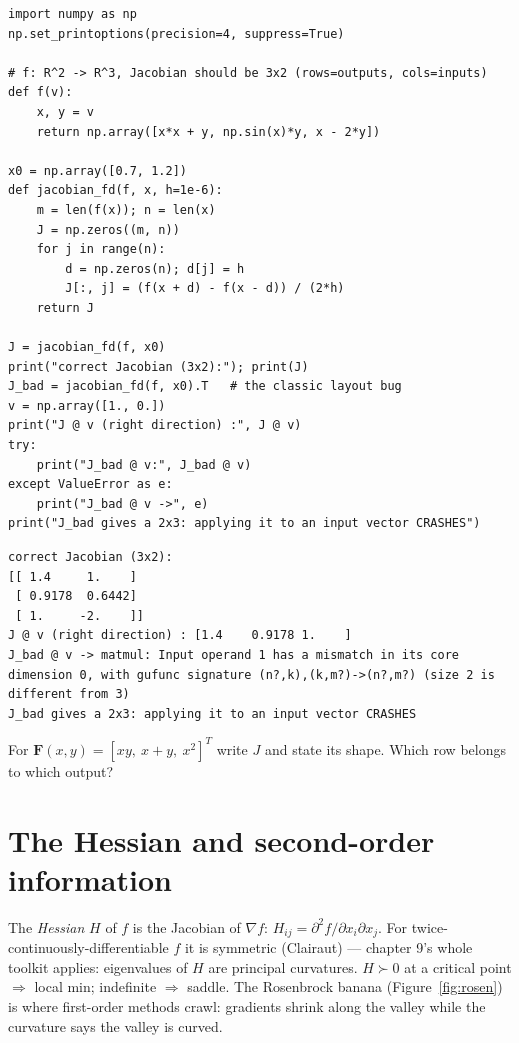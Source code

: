\begin{lstlisting}[caption={\ttfamily code/ch11\_wrong\_layout.py --- the
instructive layout bug: transposing the Jacobian produces a $2\times3$
that cannot even act on an input vector.}]
import numpy as np
np.set_printoptions(precision=4, suppress=True)

# f: R^2 -> R^3, Jacobian should be 3x2 (rows=outputs, cols=inputs)
def f(v):
    x, y = v
    return np.array([x*x + y, np.sin(x)*y, x - 2*y])

x0 = np.array([0.7, 1.2])
def jacobian_fd(f, x, h=1e-6):
    m = len(f(x)); n = len(x)
    J = np.zeros((m, n))
    for j in range(n):
        d = np.zeros(n); d[j] = h
        J[:, j] = (f(x + d) - f(x - d)) / (2*h)
    return J

J = jacobian_fd(f, x0)
print("correct Jacobian (3x2):"); print(J)
J_bad = jacobian_fd(f, x0).T   # the classic layout bug
v = np.array([1., 0.])
print("J @ v (right direction) :", J @ v)
try:
    print("J_bad @ v:", J_bad @ v)
except ValueError as e:
    print("J_bad @ v ->", e)
print("J_bad gives a 2x3: applying it to an input vector CRASHES")
\end{lstlisting}

\begin{lstlisting}[caption={Output of the layout bug. Notice the
transposed Jacobian is a $2\times3$ --- the error only fires when you try
to apply it. Layout bugs in gradients are silent precisely where the
shapes happen to agree.}]
correct Jacobian (3x2):
[[ 1.4     1.    ]
 [ 0.9178  0.6442]
 [ 1.     -2.    ]]
J @ v (right direction) : [1.4    0.9178 1.    ]
J_bad @ v -> matmul: Input operand 1 has a mismatch in its core dimension 0, with gufunc signature (n?,k),(k,m?)->(n?,m?) (size 2 is different from 3)
J_bad gives a 2x3: applying it to an input vector CRASHES
\end{lstlisting}

\begin{exercise}[easy]
For $\mathbf F(x,y)=[xy,\ x+y,\ x^{2}]^{T}$ write $J$ and state its
shape. Which row belongs to which output?
\end{exercise}

\section{The Hessian and second-order information}\label{sec:mvc-hess}

The \emph{Hessian} $H$ of $f$ is the Jacobian of
$\nabla f$: $H_{ij}=\partial^{2}f/\partial x_i\partial x_j$. For
twice-continuously-differentiable $f$ it is symmetric (Clairaut) ---
chapter 9's whole toolkit applies: eigenvalues of $H$ are principal
curvatures. $H\succ0$ at a critical point $\Rightarrow$ local min;
indefinite $\Rightarrow$ saddle. The Rosenbrock banana
(Figure~\ref{fig:rosen}) is where first-order methods crawl: gradients
shrink along the valley while the curvature says the valley is curved.

